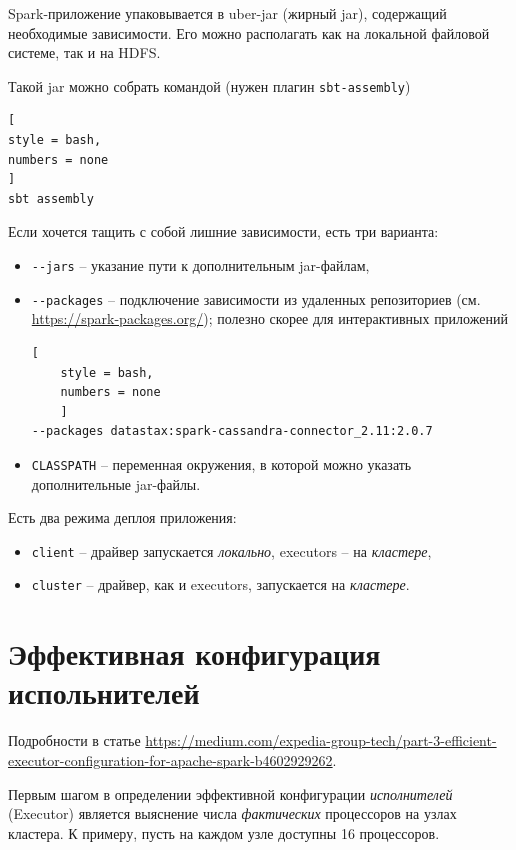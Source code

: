 \documentclass[%
	11pt,
	a4paper,
	utf8,
		]{article}
\begin{document}
Spark-приложение упаковывается в uber-jar (жирный jar), содержащий необходимые зависимости. Его можно располагать как на локальной файловой системе, так и на HDFS.

Такой jar можно собрать командой (нужен плагин \texttt{sbt-assembly})
\begin{lstlisting}[
style = bash,
numbers = none	
]
sbt assembly
\end{lstlisting}

Если хочется тащить с собой лишние зависимости, есть три варианта:
\begin{itemize}
	\item \verb*|--jars| -- указание пути к дополнительным jar-файлам,
	
	\item \verb*|--packages| -- подключение зависимости из удаленных репозиториев (см. \url{https://spark-packages.org/}); полезно скорее для интерактивных приложений
	
	\begin{lstlisting}[
	style = bash,
	numbers = none
	]
--packages datastax:spark-cassandra-connector_2.11:2.0.7
	\end{lstlisting}

    \item \texttt{CLASSPATH} -- переменная окружения, в которой можно указать дополнительные jar-файлы.
\end{itemize}

Есть два режима деплоя приложения:
\begin{itemize}
	\item \texttt{client} -- драйвер запускается \emph{локально}, executors -- на \emph{кластере},
	
	\item \texttt{cluster} -- драйвер, как и executors, запускается на \emph{кластере}.
\end{itemize}

\section{Эффективная конфигурация испольнителей}

Подробности в статье \url{https://medium.com/expedia-group-tech/part-3-efficient-executor-configuration-for-apache-spark-b4602929262}.

Первым шагом в определении эффективной конфигурации \emph{исполнителей} (Executor) является выяснение числа \emph{фактических} процессоров на узлах кластера. К примеру, пусть на каждом узле доступны 16 процессоров.
\end{document}
